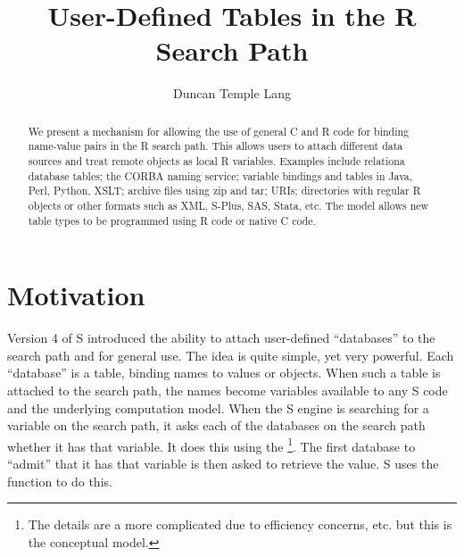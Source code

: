 \documentclass{article}
\title{User-Defined Tables in the R Search Path}
\author{Duncan Temple Lang}
\begin{document}
\maketitle

\begin{abstract}
 We present a mechanism for allowing the use of general
 C and R code for binding name-value pairs in the R search path.
 This allows users to attach different data sources and treat
 remote objects as local R variables.
 Examples include relationa database tables; the CORBA naming service;
 variable bindings and tables in Java, Perl, Python, XSLT; archive files
 using zip and tar; URIs; directories with regular R objects or
 other formats such as XML, S-Plus, SAS, Stata, etc.
 The model allows new table types to be programmed using
 R code or native C code.
\end{abstract}

\section{Motivation}

Version 4 of S introduced the ability to attach user-defined
``databases'' to the search path and for general use.  The idea is
quite simple, yet very powerful. Each ``database'' is a table, binding
names to values or objects.  When such a table is attached to the
search path, the names become variables available to any S code and
the underlying computation model.  When the S engine is searching for
a variable on the search path, it asks each of the databases on the
search path whether it has that variable.  It does this using the
\footnote{The details are a more complicated due to
  efficiency concerns, etc.  but this is the conceptual model.}.  The
first database to ``admit'' that it has that variable is then asked to
retrieve the value. S uses the  function to do this.
\end{document}
